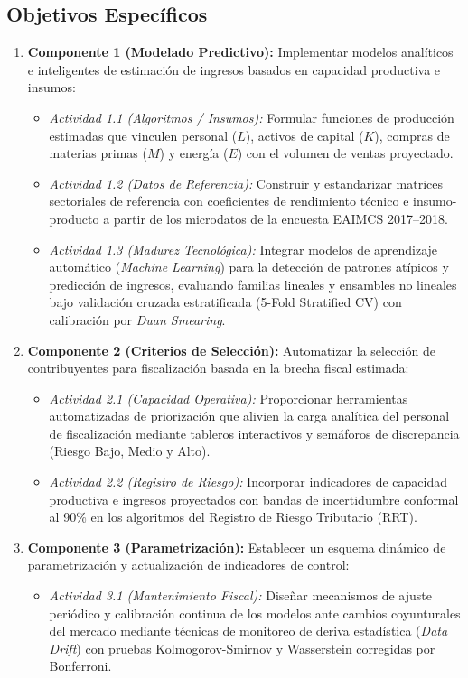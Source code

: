 \subsection{Objetivos Específicos}
\begin{enumerate}
    \item \textbf{Componente 1 (Modelado Predictivo):} Implementar modelos analíticos e inteligentes de estimación de ingresos basados en capacidad productiva e insumos:
    \begin{itemize}
        \item \textit{Actividad 1.1 (Algoritmos / Insumos):} Formular funciones de producción estimadas que vinculen personal ($L$), activos de capital ($K$), compras de materias primas ($M$) y energía ($E$) con el volumen de ventas proyectado.
        \item \textit{Actividad 1.2 (Datos de Referencia):} Construir y estandarizar matrices sectoriales de referencia con coeficientes de rendimiento técnico e insumo-producto a partir de los microdatos de la encuesta EAIMCS 2017--2018.
        \item \textit{Actividad 1.3 (Madurez Tecnológica):} Integrar modelos de aprendizaje automático (\textit{Machine Learning}) para la detección de patrones atípicos y predicción de ingresos, evaluando familias lineales y ensambles no lineales bajo validación cruzada estratificada (5-Fold Stratified CV) con calibración por \textit{Duan Smearing}.
    \end{itemize}
    
    \item \textbf{Componente 2 (Criterios de Selección):} Automatizar la selección de contribuyentes para fiscalización basada en la brecha fiscal estimada:
    \begin{itemize}
        \item \textit{Actividad 2.1 (Capacidad Operativa):} Proporcionar herramientas automatizadas de priorización que alivien la carga analítica del personal de fiscalización mediante tableros interactivos y semáforos de discrepancia (Riesgo Bajo, Medio y Alto).
        \item \textit{Actividad 2.2 (Registro de Riesgo):} Incorporar indicadores de capacidad productiva e ingresos proyectados con bandas de incertidumbre conformal al 90\% en los algoritmos del Registro de Riesgo Tributario (RRT).
    \end{itemize}
    
    \item \textbf{Componente 3 (Parametrización):} Establecer un esquema dinámico de parametrización y actualización de indicadores de control:
    \begin{itemize}
        \item \textit{Actividad 3.1 (Mantenimiento Fiscal):} Diseñar mecanismos de ajuste periódico y calibración continua de los modelos ante cambios coyunturales del mercado mediante técnicas de monitoreo de deriva estadística (\textit{Data Drift}) con pruebas Kolmogorov-Smirnov y Wasserstein corregidas por Bonferroni.
    \end{itemize}
\end{enumerate}

